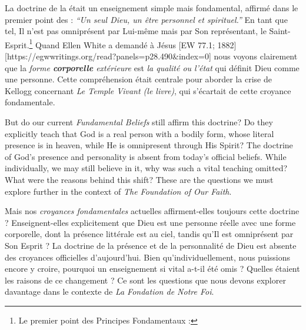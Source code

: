 La doctrine de la  était un enseignement simple mais fondamental, affirmé dans le premier point des  : \textit{“Un seul Dieu, un être personnel et spirituel.”} En tant que tel, Il n'est pas omniprésent par Lui-même mais par Son représentant, le Saint-Esprit.\footnote{Le premier point des Principes Fondamentaux : } Quand Ellen White a demandé à Jésus [EW 77.1; 1882][https://egwwritings.org/read?panels=p28.490&index=0] nous voyons clairement que la \textit{forme \textbf{corporelle} extérieure} est \textit{la qualité ou l'état} qui définit Dieu comme une personne. Cette compréhension était centrale pour aborder la crise de Kellogg concernant \textit{Le Temple Vivant (le livre)}, qui s'écartait de cette croyance fondamentale.


But do our current \textit{Fundamental Beliefs} still affirm this doctrine? Do they explicitly teach that God is a real person with a bodily form, whose literal presence is in heaven, while He is omnipresent through His Spirit? The doctrine of God’s presence and personality is absent from today’s official beliefs. While individually, we may still believe in it, why was such a vital teaching omitted? What were the reasons behind this shift? These are the questions we must explore further in the context of \textit{The Foundation of Our Faith}.


Mais nos \textit{croyances fondamentales} actuelles affirment-elles toujours cette doctrine ? Enseignent-elles explicitement que Dieu est une personne réelle avec une forme corporelle, dont la présence littérale est au ciel, tandis qu'Il est omniprésent par Son Esprit ? La doctrine de la présence et de la personnalité de Dieu est absente des croyances officielles d'aujourd'hui. Bien qu'individuellement, nous puissions encore y croire, pourquoi un enseignement si vital a-t-il été omis ? Quelles étaient les raisons de ce changement ? Ce sont les questions que nous devons explorer davantage dans le contexte de \textit{La Fondation de Notre Foi}.


